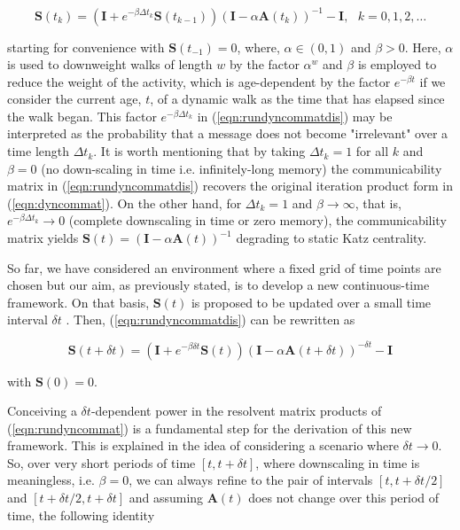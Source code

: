 \begin{equation}
\label{eqn:rundyncommatdis}
    \mathbf{S}(t_{k}) = \left(\mathbf{I} + e^{-\beta\Delta t_k} \mathbf{S}(t_{k-1})\right)\left(\mathbf{I} -  \alpha \mathbf{A}(t_{k})\right)^{-1} - \mathbf{I}, ~~~k=0,1,2,\dots
\end{equation} 

 starting for convenience with $\mathbf{S}(t_{-1}) =0$, where, $\alpha \in (0,1)$ and $\beta > 0$. Here, $\alpha$ is used to downweight walks of length $w$ by the factor $\alpha^w$ and $\beta$ is employed to reduce the weight of the activity, which is age-dependent by the factor $e^{-\beta t}$ if we consider the current age, $t$, of a dynamic walk as the time that has elapsed since the walk began. This factor $e^{-\beta\Delta t_k}$ in (\ref{eqn:rundyncommatdis}) may be interpreted as the probability that a message does not become "irrelevant" over a time length $\Delta t_k$. It is worth mentioning that by taking $\Delta t_k = 1$ for all $k$ and $\beta = 0$ (no down-scaling in time i.e. infinitely-long memory) the communicability matrix in (\ref{eqn:rundyncommatdis}) recovers the original iteration product form in (\ref{eqn:dyncommat}). On the other hand, for $\Delta t_k = 1$ and $\beta \to \infty$, that is, $e^{-\beta\Delta t_k}\to 0$ (complete downscaling in time or zero memory), the communicability matrix yields $\mathbf{S}(t)=(\mathbf{I} - \alpha \mathbf{A}(t))^{-1}$ degrading to static Katz centrality.

 So far, we have considered an environment where a fixed grid of time points are chosen but our aim, as previously stated, is to develop a new continuous-time framework. On that basis, $\mathbf{S}(t)$ is proposed to be updated over a small time interval $\delta t$ \cite{grindrod2014dynamical}. Then, (\ref{eqn:rundyncommatdis}) can be rewritten as
 
 \begin{equation}
\label{eqn:rundyncommat}
    \mathbf{S}(t + \delta t) = \left(\mathbf{I} + e^{-\beta\delta t}\mathbf{S}(t)\right) (\mathbf{I} - \alpha\mathbf{A}(t+\delta t))^{-\delta t} - \mathbf{I}
\end{equation} 

with $\mathbf{S}(0)=0$.

Conceiving a $\delta t$-dependent power in the resolvent matrix products of (\ref{eqn:rundyncommat}) is a fundamental step for the derivation of this new framework. This is explained in the idea of considering a scenario where $\delta t \to 0$. So, over very short periods of time $[t,t+\delta t]$, where downscaling in time is meaningless, i.e. $\beta = 0$, we can always refine to the pair of intervals $[t, t + \delta t/2]$ and $[t + \delta t/2, t + \delta t]$ and assuming $\mathbf{A}(t)$ does not change over this period of time, the following identity 

